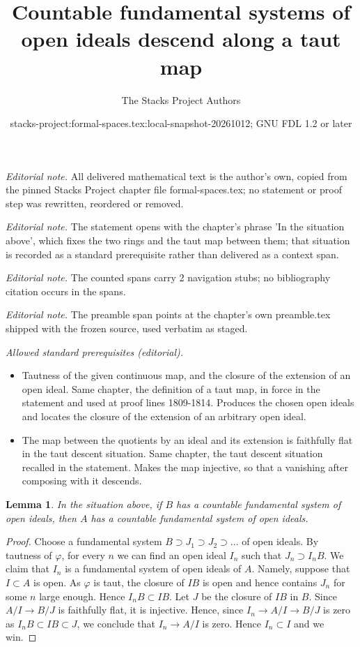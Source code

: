 \documentclass{stacks-project}
\title{Countable fundamental systems of open ideals descend along a taut map}
\author{The Stacks Project Authors}
\date{stacks-project:formal-spaces.tex:local-snapshot-20261012; GNU FDL 1.2 or later}
\theoremstyle{plain}
\newtheorem{lemma}[subsection]{Lemma}
\theoremstyle{definition}
\theoremstyle{remark}
\numberwithin{equation}{subsection}
\begin{document}
\maketitle
\noindent\textit{Editorial note.} All delivered mathematical text is the author's own, copied from the pinned Stacks Project chapter file formal-spaces.tex; no statement or proof step was rewritten, reordered or removed.\par\medskip
\noindent\textit{Editorial note.} The statement opens with the chapter's phrase 'In the situation above', which fixes the two rings and the taut map between them; that situation is recorded as a standard prerequisite rather than delivered as a context span.\par\medskip
\noindent\textit{Editorial note.} The counted spans carry 2 navigation stubs; no bibliography citation occurs in the spans.\par\medskip
\noindent\textit{Editorial note.} The preamble span points at the chapter's own preamble.tex shipped with the frozen source, used verbatim as staged.\par\medskip
\noindent\textit{Allowed standard prerequisites (editorial).}\begin{itemize}
\item Tautness of the given continuous map, and the closure of the extension of an open ideal. Same chapter, the definition of a taut map, in force in the statement and used at proof lines 1809-1814. Produces the chosen open ideals and locates the closure of the extension of an arbitrary open ideal.
\item The map between the quotients by an ideal and its extension is faithfully flat in the taut descent situation. Same chapter, the taut descent situation recalled in the statement. Makes the map injective, so that a vanishing after composing with it descends.
\end{itemize}\medskip
\begin{lemma}
\label{lemma-taut-descent-countable}
In the situation above, if $B$ has a countable fundamental system of
open ideals, then $A$ has a countable fundamental system of open ideals.
\end{lemma}

\begin{proof}
Choose a fundamental system $B \supset J_1 \supset J_2 \supset \ldots$
of open ideals. By tautness of $\varphi$, for every $n$ we can find an
open ideal $I_n$ such that $J_n \supset I_nB$. We claim that
$I_n$ is a fundamental system of open ideals of $A$.
Namely, suppose that $I \subset A$ is open. As $\varphi$ is taut,
the closure of $IB$ is open and hence contains $J_n$ for some $n$
large enough. Hence $I_nB \subset IB$. Let $J$ be the closure of
$IB$ in $B$. Since $A/I \to B/J$ is faithfully flat, it is injective.
Hence, since $I_n \to A/I \to B/J$ is zero as $I_nB \subset IB \subset J$,
we conclude that $I_n \to A/I$ is zero. Hence $I_n \subset I$ and
we win.
\end{proof}
\end{document}
